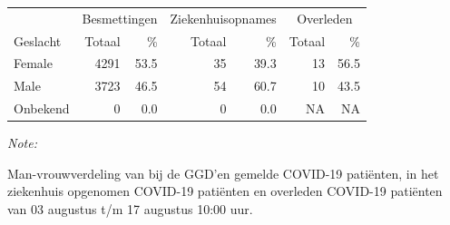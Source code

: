 \documentclass[
  english,
  man,floatsintext]{apa6}
\begin{document}
\begin{table}[H]
\centering\begingroup\fontsize{11}{13}\selectfont

\begin{threeparttable}
\begin{tabular}{lrrrrrr}
\toprule
\multicolumn{1}{c}{ } & \multicolumn{2}{c}{Besmettingen} & \multicolumn{2}{c}{Ziekenhuisopnames} & \multicolumn{2}{c}{Overleden} \\
\cmidrule(l{3pt}r{3pt}){2-3} \cmidrule(l{3pt}r{3pt}){4-5} \cmidrule(l{3pt}r{3pt}){6-7}
Geslacht & Totaal & \% & Totaal & \% & Totaal & \%\\
\midrule
Female & 4291 & 53.5 & 35 & 39.3 & 13 & 56.5\\
Male & 3723 & 46.5 & 54 & 60.7 & 10 & 43.5\\
Onbekend & 0 & 0.0 & 0 & 0.0 & NA & NA\\
\bottomrule
\end{tabular}
\begin{tablenotes}
\item \textit{Note: } 
\item Man-vrouwverdeling van bij de GGD’en gemelde COVID-19 patiënten, in het ziekenhuis opgenomen COVID-19 patiënten en overleden COVID-19 patiënten van 03 augustus t/m 17 augustus 10:00 uur.
\end{tablenotes}
\end{threeparttable}
\endgroup{}
\end{table}
\newpage
\end{document}
